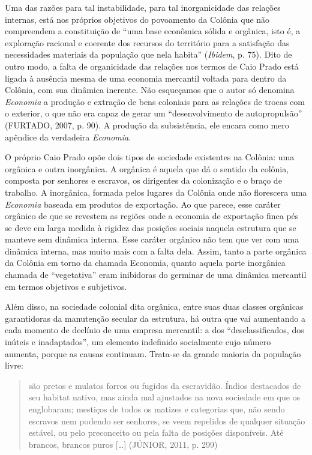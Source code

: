 Uma das razões para tal instabilidade, para tal inorganicidade das
relações internas, está nos próprios objetivos do povoamento da Colônia
que não compreendem a constituição de ``uma base econômica sólida e
orgânica, isto é, a exploração racional e coerente dos recursos do
território para a satisfação das necessidades materiais da população que
nela habita'' (\emph{Ibidem}, p. 75)\emph{.} Dito de outro modo, a falta
de organicidade das relações nos termos de Caio Prado está ligada à
ausência mesma de uma economia mercantil voltada para dentro da Colônia,
com sua dinâmica inerente. Não esqueçamos que o autor só denomina
\emph{Economia} a produção e extração de bens coloniais para as relações
de trocas com o exterior, o que não era capaz de gerar um
``desenvolvimento de autopropulsão'' (FURTADO, 2007, p. 90). A produção
da subsistência, ele encara como mero apêndice da verdadeira
\emph{Economia}.

O próprio Caio Prado opõe dois tipos de sociedade existentes na Colônia:
uma orgânica e outra inorgânica. A orgânica é aquela que dá o sentido da
colônia, composta por senhores e escravos, os dirigentes da colonização
e o braço de trabalho. A inorgânica, formada pelos lugares da Colônia
onde não florescera uma \emph{Economia} baseada em produtos de
exportação. Ao que parece, esse caráter orgânico de que se revestem as
regiões onde a economia de exportação finca pés se deve em larga medida
à rigidez das posições sociais naquela estrutura que se manteve sem
dinâmica interna. Esse caráter orgânico não tem que ver com uma dinâmica
interna, mas muito mais com a falta dela. Assim, tanto a parte orgânica
da Colônia em torno da chamada Economia, quanto aquela parte inorgânica
chamada de ``vegetativa'' eram inibidoras do germinar de uma dinâmica
mercantil em termos objetivos e subjetivos.

Além disso, na sociedade colonial dita orgânica, entre suas duas classes
orgânicas garantidoras da manutenção secular da estrutura, há outra que
vai aumentando a cada momento de declínio de uma empresa mercantil: a
dos ``desclassificados, dos inúteis e inadaptados'', um elemento
indefinido socialmente cujo número aumenta, porque as causas continuam.
Trata-se da grande maioria da população livre:

\begin{quote}
são pretos e mulatos forros ou fugidos da escravidão. Índios destacados
de seu habitat nativo, mas ainda mal ajustados na nova sociedade em que
os englobaram; mestiços de todos os matizes e categorias que, não sendo
escravos nem podendo ser senhores, se veem repelidos de qualquer
situação estável, ou pelo preconceito ou pela falta de posições
disponíveis. Até brancos, brancos puros {[}\ldots{}{]} (JÚNIOR, 2011, p.
299)
\end{quote}


